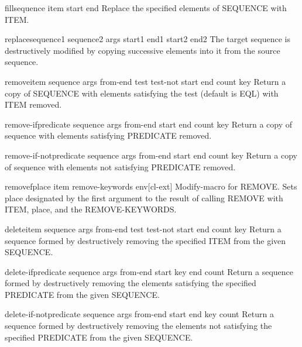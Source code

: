 \documentclass[10pt,english]{book}
\begin{document}
\begin{function}{fill}{sequence item \key start end}
  Replace the specified elements of SEQUENCE with ITEM.
\end{function}

\begin{function}{replace}{sequence1 sequence2 \rest args \key start1 end1 start2 end2}
  The target sequence is destructively modified by copying successive
  elements into it from the source sequence.
\end{function}

\begin{function}{remove}{item sequence \rest args \key from-end test test-not start end count key}
  Return a copy of SEQUENCE with elements satisfying the test (default is
  EQL) with ITEM removed.
\end{function}

\begin{function}{remove-if}{predicate sequence \rest args \key from-end start end count key}
  Return a copy of sequence with elements satisfying PREDICATE removed.
\end{function}

\begin{function}{remove-if-not}{predicate sequence \rest args \key from-end start end count key}
  Return a copy of sequence with elements not satisfying PREDICATE removed.
\end{function}

\begin{macro}{removef}{place item \rest remove-keywords \env env}[cl-ext]
  Modify-macro for REMOVE. Sets place designated by the first argument
  to the result of calling REMOVE with ITEM, place, and the
  REMOVE-KEYWORDS.
\end{macro}

\begin{function}{delete}{item sequence \rest args \key from-end test test-not start end count key}
  Return a sequence formed by destructively removing the specified ITEM from
  the given SEQUENCE.
\end{function}

\begin{function}{delete-if}{predicate sequence \rest args \key from-end start key end count}
  Return a sequence formed by destructively removing the elements satisfying
  the specified PREDICATE from the given SEQUENCE.
\end{function}

\begin{function}{delete-if-not}{predicate sequence \rest args \key from-end start end key count}
  Return a sequence formed by destructively removing the elements not
  satisfying the specified PREDICATE from the given SEQUENCE.
\end{function}
\end{document}
